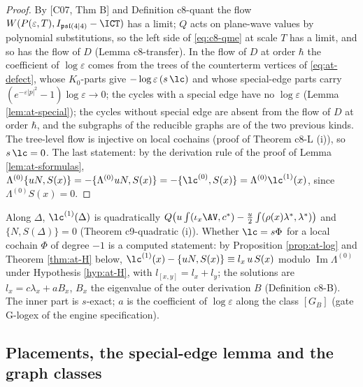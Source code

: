 \begin{proof}
By [C07, Thm B] and Definition c8-quant the flow $W(P(\varepsilon,T),I_{\mathfrak{psl}(4|4)}-\ICT)$ has a limit; $Q$ acts on plane-wave values by polynomial substitutions, so the left side of \eqref{eq:c8-qme} at scale $T$ has a limit, and so has the flow of $D$ (Lemma c8-transfer). In the flow of $D$ at order $\hbar$ the coefficient of $\log\varepsilon$ comes from the trees of the counterterm vertices of \eqref{eq:at-defect}, whose $K_0$-parts give $-\log\varepsilon\,(s\,\lc)$ and whose special-edge parts carry $(e^{-\varepsilon|p|^2}-1)\log\varepsilon\to0$; the cycles with a special edge have no $\log\varepsilon$ (Lemma \ref{lem:at-special}); the cycles without special edge are absent from the flow of $D$ at order $\hbar$, and the subgraphs of the reducible graphs are of the two previous kinds. The tree-level flow is injective on local cochains (proof of Theorem c8-L (i)), so $s\,\lc=0$. The last statement: by the derivation rule of the proof of Lemma \ref{lem:at-sformulas}, $\Lambda^{(0)}\{uN,S(x)\}=-\{\Lambda^{(0)}uN,S(x)\}=-\{\lc^{(0)},S(x)\}=\Lambda^{(0)}\lc^{(1)}(x)$, since $\Lambda^{(0)}S(x)=0$.
\end{proof}

\begin{remark}
\label{rem:at-logexact}
Along $\Delta$, $\lc^{(1)}(\Delta)$ is quadratically $Q\big(u\int(\iota_x\AV,c^*)-\tfrac u2\int(\rho(x)\lambda^*,\lambda^*)\big)$ and $\{N,S(\Delta)\}=0$ (Theorem c9-quadratic (i)). Whether $\lc=s\Phi$ for a local cochain $\Phi$ of degree $-1$ is a computed statement: by Proposition \ref{prop:at-log} and Theorem \ref{thm:at-H} below, $\lc^{(1)}(x)-\{uN,S(x)\}\equiv l_x\,u\,S(x)$ modulo $\operatorname{Im}\Lambda^{(0)}$ under Hypothesis \ref{hyp:at-H}, with $l_{[x,y]}=l_x+l_y$; the solutions are $l_x=c\lambda_x+aB_x$, $B_x$ the eigenvalue of the outer derivation $B$ (Definition c8-B). The inner part is $s$-exact; $a$ is the coefficient of $\log\varepsilon$ along the class $[G_B]$ (gate G-logex of the engine specification).
\end{remark}

\subsection{Placements, the special-edge lemma and the graph classes}

